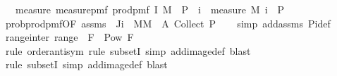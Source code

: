 \begin{isabellebody}
\ \ \ {\isachardoublequoteopen}measure\ {\isacharparenleft}{\kern0pt}measure{\isacharunderscore}{\kern0pt}pmf\ {\isacharparenleft}{\kern0pt}prod{\isacharunderscore}{\kern0pt}pmf\ I\ M{\isacharparenright}{\kern0pt}{\isacharparenright}{\kern0pt}\ {\isacharbraceleft}{\kern0pt}{\isasymomega}{\isachardot}{\kern0pt}\ P\ {\isacharparenleft}{\kern0pt}{\isasymomega}\ i{\isacharparenright}{\kern0pt}{\isacharbraceright}{\kern0pt}\ {\isacharequal}{\kern0pt}\ measure\ {\isacharparenleft}{\kern0pt}M\ i{\isacharparenright}{\kern0pt}\ {\isacharbraceleft}{\kern0pt}{\isasymomega}{\isachardot}{\kern0pt}\ P\ {\isasymomega}{\isacharbraceright}{\kern0pt}{\isachardoublequoteclose}\isanewline
%
\isadelimproof
\ \ %
\endisadelimproof
%
\isatagproof
{}\isamarkupfalse%
\ prob{\isacharunderscore}{\kern0pt}prod{\isacharunderscore}{\kern0pt}pmf{\isacharprime}{\kern0pt}{\isacharbrackleft}{\kern0pt}OF\ assms{\isacharparenleft}{\kern0pt}{}{\isacharparenright}{\kern0pt}{\isacharcomma}{\kern0pt}\ \ J{\isacharequal}{\kern0pt}{\isachardoublequoteopen}{\isacharbraceleft}{\kern0pt}i{\isacharbraceright}{\kern0pt}{\isachardoublequoteclose}\ \ M{\isacharequal}{\kern0pt}{\isachardoublequoteopen}M{\isachardoublequoteclose}\ \ A{\isacharequal}{\kern0pt}{\isachardoublequoteopen}{\isasymlambda}{\isacharunderscore}{\kern0pt}{\isachardot}{\kern0pt}\ Collect\ P{\isachardoublequoteclose}{\isacharbrackright}{\kern0pt}\isanewline
\ \ \isamarkupfalse%
\ {\isacharparenleft}{\kern0pt}simp\ add{\isacharcolon}{\kern0pt}assms\ Pi{\isacharunderscore}{\kern0pt}def{\isacharparenright}{\kern0pt}%
\endisatagproof
{\isafoldproof}%
%
\isadelimproof
\isanewline
%
\endisadelimproof
\isanewline
{}\isamarkupfalse%
\ range{\isacharunderscore}{\kern0pt}inter{\isacharcolon}{\kern0pt}\ {\isachardoublequoteopen}range\ {\isacharparenleft}{\kern0pt}{\isacharparenleft}{\kern0pt}{\isasyminter}{\isacharparenright}{\kern0pt}\ F{\isacharparenright}{\kern0pt}\ {\isacharequal}{\kern0pt}\ Pow\ F{\isachardoublequoteclose}\isanewline
%
\isadelimproof
\ \ %
\endisadelimproof
%
\isatagproof
{}\isamarkupfalse%
\ {\isacharparenleft}{\kern0pt}rule\ order{\isacharunderscore}{\kern0pt}antisym{\isacharcomma}{\kern0pt}\ rule\ subsetI{\isacharcomma}{\kern0pt}\ simp\ add{\isacharcolon}{\kern0pt}image{\isacharunderscore}{\kern0pt}def{\isacharcomma}{\kern0pt}\ blast{\isacharparenright}{\kern0pt}\isanewline
\ \ \isamarkupfalse%
\ {\isacharparenleft}{\kern0pt}rule\ subsetI{\isacharcomma}{\kern0pt}\ simp\ add{\isacharcolon}{\kern0pt}image{\isacharunderscore}{\kern0pt}def{\isacharcomma}{\kern0pt}\ blast{\isacharparenright}{\kern0pt}%

\end{isabellebody}
